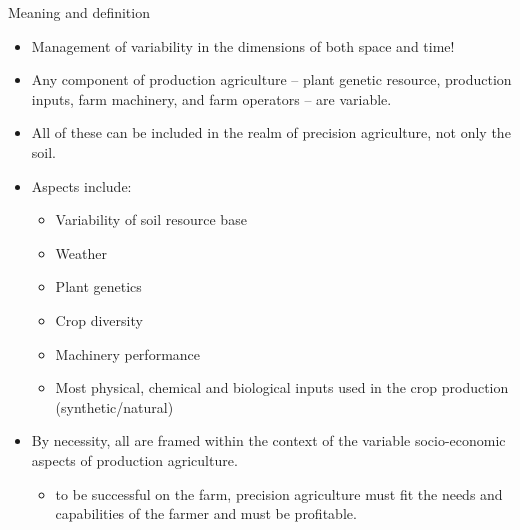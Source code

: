 \documentclass[11pt,dvipsnames,ignorenonframetext,aspectratio=169]{beamer}
\providecommand{\tightlist}{%
  \setlength{\itemsep}{0pt}\setlength{\parskip}{0pt}}
\begin{document}
\begin{frame}{Meaning and definition}
\protect\hypertarget{meaning-and-definition}{}
\begin{itemize}
\tightlist
\item
  Management of \alert{variability} in the dimensions of both space and
  time!
\item
  Any component of production agriculture -- plant genetic resource,
  production inputs, farm machinery, and farm operators -- are variable.
\item
  All of these can be included in the realm of precision agriculture,
  not only the soil.
\item
  Aspects include:

  \begin{itemize}
  \footnotesize
  \item Variability of soil resource base
  \item Weather
  \item Plant genetics
  \item Crop diversity
  \item Machinery performance
  \item Most physical, chemical and biological inputs used in the crop production (synthetic/natural)
  \end{itemize}
\item
  By necessity, all are framed within the context of the variable
  socio-economic aspects of production agriculture.

  \begin{itemize}
  \footnotesize
  \item to be successful on the farm, precision agriculture must fit the needs and capabilities of the farmer and must be profitable.
  \end{itemize}
\end{itemize}
\end{frame}
\end{document}
